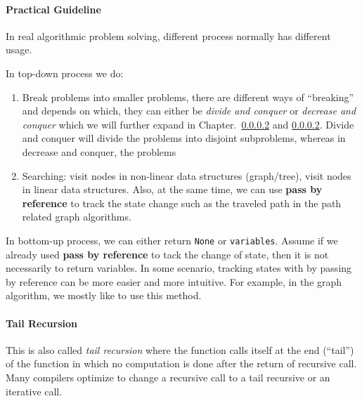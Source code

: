 \documentclass[../main.tex]{subfiles}
\begin{document}
\paragraph{Practical Guideline}
In real algorithmic problem solving, different process normally has different usage. 
   
In top-down process we do:
\begin{enumerate}
    \item Break problems into smaller problems, there are different ways of ``breaking'' and depends on which, they can either be \textit{divide and conquer} or \textit{decrease and conquer} which we will further expand in Chapter.~\ref{} and \ref{}. Divide and conquer will divide the problems into disjoint subproblems, whereas in decrease and conquer, the problems 
    \item Searching: visit nodes in non-linear data structures (graph/tree), visit nodes in linear data structures. Also, at the same time, we can use \textbf{pass by reference} to track the state change such as the traveled path in the path related graph algorithms. 
\end{enumerate}


In bottom-up process, we can either return \texttt{None} or \texttt{variables}. Assume if we already used \textbf{pass by reference} to tack the change of state, then it is not necessarily to return variables. In some scenario, tracking states with by passing by reference can be more easier and more intuitive. For example, in the graph algorithm, we mostly like to use this method. 

\paragraph{Tail Recursion}
This is also called \textit{tail recursion}  where the function calls itself at the end (``tail'') of the function in which no computation is done after the return of recursive call. Many compilers optimize to change a recursive call to a tail recursive or an iterative call.

\end{document}
